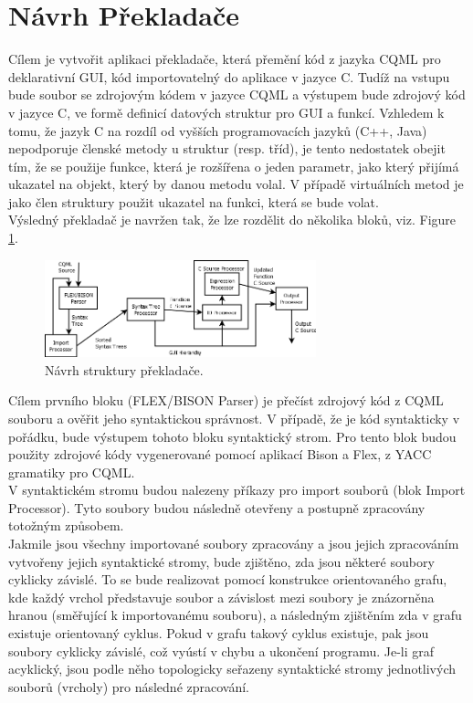 \documentclass[report,11pt]{elsarticle}
\begin{document}
\section{Návrh Překladače}
Cílem je vytvořit aplikaci překladače, která přemění kód z jazyka CQML pro deklarativní GUI, kód importovatelný do aplikace v jazyce C. Tudíž na vstupu bude soubor se zdrojovým kódem v jazyce CQML a výstupem bude zdrojový kód v jazyce C, ve formě definicí datových struktur pro GUI a funkcí. Vzhledem k tomu, že jazyk C na rozdíl od vyšších programovacích jazyků (C++, Java) nepodporuje členské metody u struktur (resp. tříd), je tento nedostatek obejit tím, že se použije funkce, která je rozšířena o jeden parametr, jako který přijímá ukazatel na objekt, který by danou metodu volal. V případě virtuálních metod je jako člen struktury použit ukazatel na funkci, která se bude volat.\\
Výsledný překladač je navržen tak, že lze rozdělit do několika bloků, viz. Figure \ref{fig:fig1}.\\
\begin{figure}[!ht]
\begin{center}
  \includegraphics[width=0.7\textwidth]{parserdiag}
\caption{{\label{fig:fig1}}Návrh struktury překladače.}
\end{center}
\end{figure}
Cílem prvního bloku (FLEX/BISON Parser) je přečíst zdrojový kód z CQML souboru a ověřit jeho syntaktickou správnost. V případě, že je kód syntakticky v pořádku, bude výstupem tohoto bloku syntaktický strom. Pro tento blok budou použity zdrojové kódy vygenerované pomocí aplikací Bison a Flex, z YACC gramatiky pro CQML.\\
V syntaktickém stromu budou nalezeny příkazy pro import souborů (blok Import Processor). Tyto soubory budou následně otevřeny a postupně zpracovány totožným způsobem.\\
Jakmile jsou všechny importované soubory zpracovány a jsou jejich zpracováním vytvořeny jejich syntaktické stromy, bude zjištěno, zda jsou některé soubory cyklicky závislé. To se bude realizovat pomocí konstrukce orientovaného grafu, kde každý vrchol představuje soubor a závislost mezi soubory je znázorněna hranou (směřující k importovanému souboru), a následným zjištěním zda v grafu existuje orientovaný cyklus. Pokud v grafu takový cyklus existuje, pak jsou soubory cyklicky závislé, což vyústí v chybu a ukončení programu. Je-li graf acyklický, jsou podle něho topologicky seřazeny syntaktické stromy jednotlivých souborů (vrcholy) pro následné zpracování.\\
\end{document}
